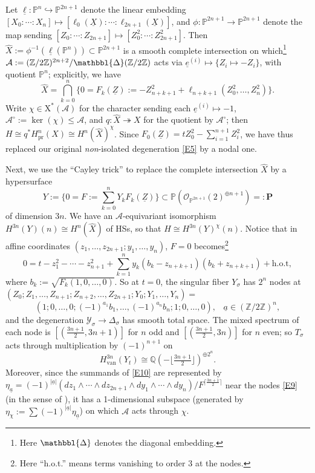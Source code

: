 \documentclass[12pt,letterpaper,english]{amsart}
\numberwithin{equation}{section}
\numberwithin{figure}{section}
\theoremstyle{plain}
\theoremstyle{remark}
\theoremstyle{definition}
\theoremstyle{definition}
\theoremstyle{plain}
\theoremstyle{plain}
\theoremstyle{plain}
\theoremstyle{plain}
\theoremstyle{definition}
\def\ul{\underline{\ell}}
\def\QQ{\mathbb{Q}}
\def\ZZ{\mathbb{Z}}
\def\PP{\mathbb{P}}
\def\Y{\mathcal{Y}}
\def\Y{\mathcal{Y}}
\def\A{\mathcal{A}}
\def\co{\mathcal{O}}
\def\NP{\mathbbl{\Delta}}
\def\ua{\underline{a}}
\def\NP{\mathbbl{\Delta}}
\def\van{\mathrm{van}}
\def\UZ{\underline{Z}}
\def\ue{\underline{e}}
\def\pr{\mathrm{pr}}
\def\UX{\underline{X}}
\theoremstyle{definition}
\begin{document}
Let $\ul\colon \PP^n\hookrightarrow \PP^{2n+1}$ denote the linear embedding $[X_0{:}\cdots{:}X_n]\mapsto [\ell_0(\UX){:}\cdots {:}\ell_{2n+1}(\UX)]$, and $\phi\colon \PP^{2n+1}\to \PP^{2n+1}$ denote the map sending $[Z_0{:}\cdots {:}Z_{2n+1}]\mapsto [Z_0^2{:}\cdots {:}Z_{2n+1}^2]$. Then $\hat{X}:=\phi^{-1}(\ul(\PP^n))\subset \PP^{2n+1}$ is a smooth complete intersection on which\footnote{Here $\NP$ denotes the diagonal embedding.} $\A:=(\ZZ/2\ZZ)^{2n+2}/\NP(\ZZ/2\ZZ)$ acts via $\ue^{(i)}\mapsto \{Z_i\mapsto -Z_i\}$, with quotient $\PP^n$; explicitly, we have
\begin{equation}\label{E6}
\hat{X}=\textstyle\bigcap_{k=0}^n\{0=F_k(\UZ):=-Z_{n+k+1}^2+\ell_{n+k+1}(Z_0^2,\ldots,Z_n^2)\}.
\end{equation}
Write $\chi\in \mathrm{X}^*(\A)$ for the character sending each $\ue^{(i)}\mapsto -1$, $\A^{\circ}:=\ker(\chi)\leq \A$, and $q\colon \hat{X}\twoheadrightarrow X$ for the quotient by $\A^{\circ}$; then $H\cong q^* H^n_{\pr}(X)\cong H^n(\hat{X})^{\chi}$. Since $F_0(\UZ)=tZ_0^2-\sum_{i=1}^{n+1}Z_i^2$, we have thus replaced our original \emph{non}-isolated degeneration \eqref{E5} by a nodal one.

Next, we use the ``Cayley trick'' to replace the complete intersection $\hat{X}$ by a hypersurface
\begin{equation}\label{E7}
Y:=\{0=F:=\textstyle\sum_{k=0}^n Y_k F_k(\UZ)\}\subset \PP\left(\co_{\PP^{2n+1}}(2)^{\oplus n+1}\right)=:\mathbf{P}
\end{equation}
of dimension $3n$.  We have an $\A$-equivariant isomorphism $H^{3n}(Y)(n)\cong H^n(\hat{X})$ of HSs, so that $H\cong H^{3n}(Y)^{\chi}(n)$.  Notice that in affine coordinates $(z_1,\ldots,z_{2n+1};y_1,\ldots,y_n)$, $F=0$ becomes\footnote{Here ``h.o.t.'' means terms vanishing to order $3$ at the nodes.}
\begin{equation}\label{E8}
0=t-z_1^2-\cdots - z_{n+1}^2+\textstyle \sum_{k=1}^n y_k(b_k-z_{n+k+1})(b_k+z_{n+k+1})+\text{h.o.t},	
\end{equation}
where $b_k:=\sqrt{F_k(1,0,\ldots,0)}$. So at $t=0$, the singular fiber $Y_{\sigma}$ has $2^n$ nodes at $(Z_0;Z_1,\ldots,Z_{n+1};Z_{n+2},\ldots,Z_{2n+1};Y_0;Y_1,\ldots,Y_n)=$
\begin{equation}\label{E9}
\left(1;0,\ldots,0;(-1)^{a_1} b_1,\ldots,(-1)^{a_n}b_n;1;0,\ldots,0\right),\;\;\;\ua\in (\ZZ/2\ZZ)^n,	
\end{equation}
and the degeneration $\Y_{\sigma}\to \Delta_{\sigma}$ has smooth total space. The mixed spectrum of each node is $[(\tfrac{3n+1}{2},3n+1)]$ for $n$ odd and $[(\tfrac{3n+1}{2},3n)]$ for $n$ even; so $T_{\sigma}$ acts through multiplication by $(-1)^{n+1}$ on
\begin{equation}\label{E10}
H^{3n}_{\van}(Y_t)\cong \QQ(-\lfloor \tfrac{3n+1}{2} \rfloor)^{\oplus 2^n}.	
\end{equation}
Moreover, since the summands of \eqref{E10} are represented by $\eta_{\ua}=(-1)^{|\ua|}(dz_1\wedge \cdots \wedge dz_{2n+1}\wedge dy_1\wedge\cdots \wedge dy_n)/F^{\lceil\frac{3n+1}{2}\rceil}$ near the nodes \eqref{E9} (in the sense of \cite[\S2]{KL2}), it has a 1-dimensional subspace (generated by $\eta_{\chi}:=\sum (-1)^{|\ua|}\eta_{\ua}$) on which $\A$ acts through $\chi$.
\end{document}
